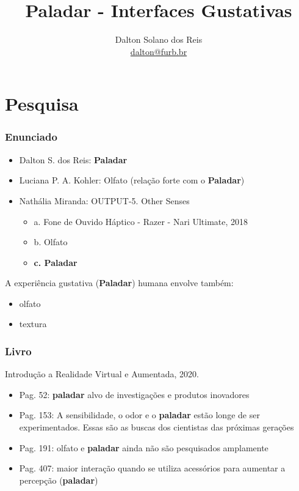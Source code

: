 \documentclass{beamer}
\title[Paladar - Interfaces Gustativas]{Paladar - Interfaces Gustativas}
\author[Dalton Solano dos Reis]{
  Dalton Solano dos Reis\texorpdfstring{\\\medskip}{}%
  {\small \href{mailto:dalton@furb.br}{dalton@furb.br}}}
\institute[UDESC]{
  Centro de Ciências e Tecnológicas\\
  Universidade do Estado de Santa Catarina}
\begin{document}
\begin{frame}
  \titlepage

\end{frame}

\section{Pesquisa}
\begin{frame}
  \frametitle{Enunciado}
  \begin{itemize}
    \item Dalton S. dos Reis: \textbf{Paladar}
    \item Luciana P. A. Kohler: Olfato (relação forte com o \textbf{Paladar})  
    \item Nathália Miranda: OUTPUT-5. Other Senses
    \begin{itemize}
      \item a. Fone de Ouvido Háptico - Razer - Nari Ultimate, 2018
      \item b. Olfato
      \item \textbf{c. Paladar}  
    \end{itemize} 
  \end{itemize}
  A experiência gustativa (\textbf{Paladar}) humana envolve também:
  \begin{itemize}
    \item olfato
    \item textura
  \end{itemize}
\end{frame}

\begin{frame}
  \frametitle{Livro}
  Introdução a Realidade Virtual e Aumentada, 2020. \\
  \begin{itemize}
    \item Pag. 52: \textbf{paladar} alvo de investigações e produtos inovadores
    \item Pag. 153: A sensibilidade, o odor e o \textbf{paladar} estão longe de ser experimentados. Essas são as buscas dos cientistas das próximas gerações
    \item Pag. 191: olfato e \textbf{paladar} ainda não são pesquisados amplamente
    \item Pag. 407: maior interação quando se utiliza acessórios para aumentar a percepção (\textbf{paladar})
  \end{itemize}
  \begin{flushright}
    \scriptsize
    \cite{toriIntroducaoRealidadeVirtual2020}
  \end{flushright}
\end{frame}
\end{document}

